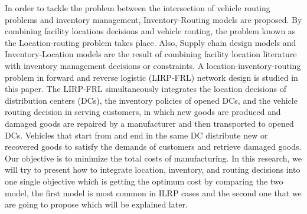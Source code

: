 \documentclass[12pt, a4paper]{article}
\begin{document}
In order to tackle the problem between the intersection of vehicle routing problems and inventory management, Inventory-Routing models are proposed. By combining facility locations decisions and vehicle routing, the problem known as the Location-routing problem takes place. Also, Supply chain design models and Inventory-Location models are the result of combining facility location literature with inventory management decisions or constraints. A location-inventory-routing problem in forward and reverse logistic (LIRP-FRL) network design is studied in this paper. The LIRP-FRL simultaneously integrates the location decisions of distribution centers (DCs), the inventory policies of opened DCs, and the vehicle routing decision in serving customers, in which new goods are produced and damaged goods are repaired by a manufacturer and then transported to opened DCs. Vehicles that start from and end in the same DC distribute new or recovered goods to satisfy the demands of customers and retrieve damaged goods. Our objective is to minimize the total costs of manufacturing. In this research, we will try to present how to integrate location, inventory, and routing decisions into one single objective which is getting the optimum cost by comparing the two model, the first model is most common in ILRP cases and the second one that we are going to propose which will be explained later.
\end{document}
